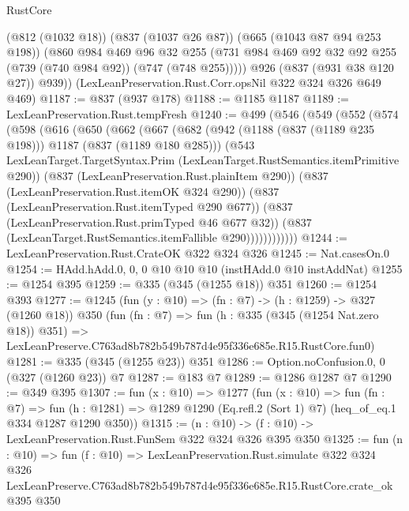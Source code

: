 \begin{lexlean}{RustCore}
\begin{coremodule}
          (@812 (@1032 @18))
          (@837 (@1037 @26 @87))
          (@665 (@1043 @87 @94 @253 @198))
          (@860
            @984
            @469
            @96
            @32
            @255
            (@731 @984 @469 @92 @32 @92 @255 (@739 (@740 @984 @92)) (@747 (@748 @255)))))
        @926
        (@837 (@931 @38 @120 @27))
        @939))
    (LexLeanPreservation.Rust.Corr.opsNil @322 @324 @326 @649 @469)
@1187 := @837 (@937 @178)
@1188 := @1185 @1187
@1189 := LexLeanPreservation.Rust.tempFresh
@1240 := @499
    (@546
      (@549
        (@552
          (@574
            (@598
              (@616
                (@650
                  (@662
                    (@667
                      (@682
                        (@942 (@1188 (@837 (@1189 @235 @198))) @1187 (@837 (@1189 @180 @285)))
                        (@543
                          LexLeanTarget.TargetSyntax.Prim
                          (LexLeanTarget.RustSemantics.itemPrimitive @290))
                        (@837 (LexLeanPreservation.Rust.plainItem @290))
                        (@837 (LexLeanPreservation.Rust.itemOK @324 @290))
                        (@837 (LexLeanPreservation.Rust.itemTyped @290 @677))
                        (@837 (LexLeanPreservation.Rust.primTyped @46 @677 @32))
                        (@837 (LexLeanTarget.RustSemantics.itemFallible @290))))))))))))
@1244 := LexLeanPreservation.Rust.CrateOK @322 @324 @326
@1245 := Nat.casesOn.{0}
@1254 := HAdd.hAdd.{0, 0, 0} @10 @10 @10 (instHAdd.{0} @10 instAddNat)
@1255 := @1254 @395
@1259 := @335 (@345 (@1255 @18)) @351
@1260 := @1254 @393
@1277 := @1245
    (fun (y : @10) => (fn : @7) -> (h : @1259) -> @327 (@1260 @18))
    @350
    (fun (fn : @7) =>
    fun (h : @335 (@345 (@1254 Nat.zero @18)) @351) =>
    LexLeanPreserve.C763ad8b782b549b787d4e95f336e685e.R15.RustCore.fun0)
@1281 := @335 (@345 (@1255 @23)) @351
@1286 := Option.noConfusion.{0, 0} (@327 (@1260 @23)) @7
@1287 := @183 @7
@1289 := @1286 @1287 @7
@1290 := @349 @395
@1307 := fun (x : @10) =>
  @1277
    (fun (x : @10) =>
    fun (fn : @7) =>
    fun (h : @1281) => @1289 @1290 (Eq.refl.{2} (Sort 1) @7) (heq_of_eq.{1} @334 @1287 @1290 @350))
@1315 := (n : @10) -> (f : @10) -> LexLeanPreservation.Rust.FunSem @322 @324 @326 @395 @350
@1325 := fun (n : @10) =>
  fun (f : @10) =>
  LexLeanPreservation.Rust.simulate
    @322
    @324
    @326
    LexLeanPreserve.C763ad8b782b549b787d4e95f336e685e.R15.RustCore.crate_ok
    @395
    @350
\end{coremodule}
\end{lexlean}
